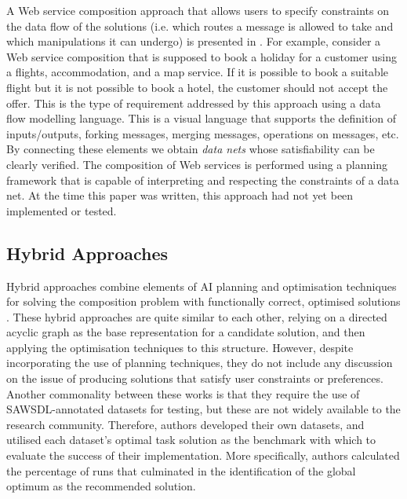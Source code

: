 A Web service composition approach that allows users to specify constraints on the data flow of the solutions (i.e. which routes a message is allowed to take and which manipulations it can undergo) is presented in \cite{marconi2006specifying}. For example, consider a Web service composition that is supposed to book a holiday for a customer using a flights, accommodation, and a map service. If it is possible to book a suitable flight but it is not possible to book a hotel, the customer should not accept the offer. This is the type of requirement addressed by this approach using a data flow modelling language. This is a visual language that supports the definition of inputs/outputs, forking messages, merging messages, operations on messages, etc. By connecting these elements we obtain \textit{data nets} whose satisfiability can be clearly verified. The composition of Web services is performed using a planning framework that is capable of interpreting and respecting the constraints of a data net. At the time this paper was written, this approach had not yet been implemented or tested.

\subsection{Hybrid Approaches}

Hybrid approaches combine elements of AI planning and optimisation techniques for solving the composition problem with functionally correct, optimised solutions \cite{cotta2007memetic,pop2011tabu,xiang2011qos,chifu2012optimizing}. These hybrid approaches are quite similar to each other, relying on a directed acyclic graph as the base representation for a candidate solution, and then applying the optimisation techniques to this structure. However, despite incorporating the use of planning techniques, they do not include any discussion on the issue of producing solutions that satisfy user constraints or preferences. Another commonality between these works is that they require the use of SAWSDL-annotated datasets for testing, but these are not widely available to the research community. Therefore, authors developed their own datasets, and utilised each dataset's optimal task solution as the benchmark with which to evaluate the success of their implementation. More specifically, authors calculated the percentage of runs that culminated in the identification of the global optimum  as the recommended solution.


